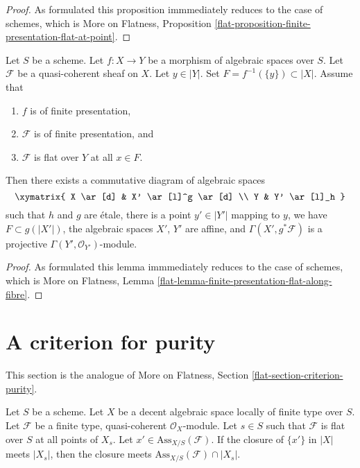 \begin{proof}
As formulated this proposition immmediately reduces
to the case of schemes, which is
More on Flatness, Proposition
\ref{flat-proposition-finite-presentation-flat-at-point}.
\end{proof}

\begin{lemma}
\label{lemma-finite-presentation-flat-along-fibre}
Let $S$ be a scheme.
Let $f : X \to Y$ be a morphism of algebraic spaces over $S$.
Let $\mathcal{F}$ be a quasi-coherent sheaf on $X$.
Let $y \in |Y|$. Set $F = f^{-1}(\{y\}) \subset |X|$. Assume that
\begin{enumerate}
\item $f$ is of finite presentation,
\item $\mathcal{F}$ is of finite presentation, and
\item $\mathcal{F}$ is flat over $Y$ at all $x \in F$.
\end{enumerate}
Then there exists a commutative diagram of algebraic spaces
$$
\xymatrix{
X \ar[d] & X' \ar[l]^g \ar[d] \\
Y & Y' \ar[l]_h
}
$$
such that $h$ and $g$ are \'etale, there is a point
$y' \in |Y'|$ mapping to $y$, we have $F \subset g(|X'|)$,
the algebraic spaces $X'$, $Y'$ are affine, and
$\Gamma(X', g^*\mathcal{F})$ is a projective
$\Gamma(Y', \mathcal{O}_{Y'})$-module.
\end{lemma}

\begin{proof}
As formulated this lemma immmediately reduces
to the case of schemes, which is
More on Flatness, Lemma
\ref{flat-lemma-finite-presentation-flat-along-fibre}.
\end{proof}




\section{A criterion for purity}
\label{section-criterion-purity}

\noindent
This section is the analogue of More on Flatness, Section
\ref{flat-section-criterion-purity}.

\begin{lemma}
\label{lemma-associated-point-specializes}
Let $S$ be a scheme. Let $X$ be a decent algebraic space
locally of finite type over $S$.
Let $\mathcal{F}$ be a finite type, quasi-coherent $\mathcal{O}_X$-module.
Let $s \in S$ such that $\mathcal{F}$ is flat over $S$ at all points of $X_s$.
Let $x' \in \text{Ass}_{X/S}(\mathcal{F})$. If
the closure of $\{x'\}$ in $|X|$ meets $|X_s|$, then the closure
meets $\text{Ass}_{X/S}(\mathcal{F}) \cap |X_s|$.
\end{lemma}

